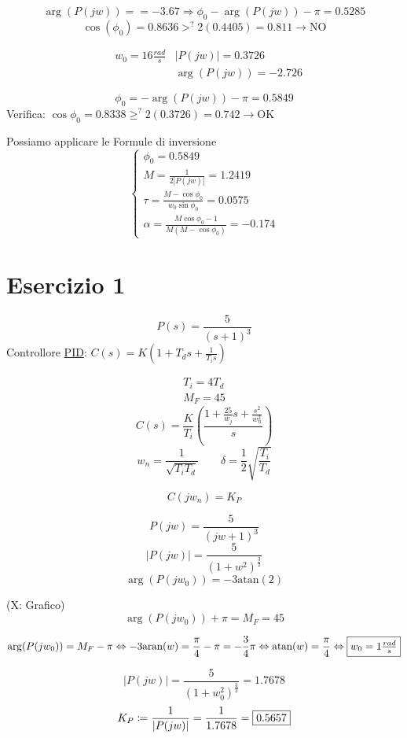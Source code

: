 \documentclass{article}
\begin{document}
\[ \arg(P(jw)) =  = -3.67 \Rightarrow \phi_0 - \arg(P(jw)) - \pi = 0.5285 \]
\[ \cos (\phi_0) = 0.8636 >^? 2(0.4405) = 0.811 \rightarrow \text{NO}\]


\[
\begin{aligned}
    &w_0 = 16 \frac{rad}{s} & |P(jw)| = 0.3726\\
& & \arg(P(jw)) = -2.726
\end{aligned}
\]

\[ \phi_0 = -\arg(P(jw)) - \pi = 0.5849 \]
Verifica: $\cos \phi_0 = 0.8338 \ge^? 2(0.3726) = 0.742 \rightarrow \text{OK}$

Possiamo applicare le Formule di inversione
\[
\begin{cases}
    \phi_0 = 0.5849\\
    M = \frac{1}{2|P(jw)|} = 1.2419\\
    \tau = \frac{M - \cos\phi_0}{w_0 \sin \phi_0} = 0.0575\\
    \alpha = \frac{M\cos\phi_0 -1} {M(M - \cos \phi_0)} = - 0.174
\end{cases}
\]

\section{Esercizio 1}

\[ P(s) = \frac{5}{(s+1)^3} \]
Controllore \underline{PID}: $ C(s) = K\left(1 + T_d s + \frac{1}{T_i s}\right)$

\[
\begin{split}
    T_i = 4T_d\\
    M_F = 45
\end{split}
\]
\[ C(s) = \frac{K}{T_i}\left( \frac{1 + \frac{25}{w_j}s + \frac{s^2}{w_n^2}}{s}\right)\]
\[ w_n = \frac{1}{\sqrt{T_iT_d}} \qquad \delta = \frac{1}{2}\sqrt{\frac{T_i}{T_d}} \]

\[ C(jw_n) = K_P \]

\[ P(jw) = \frac{5}{(jw+1)^3} \]
\[ |P(jw)| = \frac{5}{(1 + w^2) ^{\frac{3}{2}}} \]
\[ \arg(P(jw_0)) = -3 \text{atan}(2) \]

%
(X: Grafico)
\[ \arg(P(jw_0)) + \pi = M_F = 45 \]

\[ \arg(P(jw_0)) = M_F - \pi \Leftrightarrow -3 \text{aran}(w) = \frac{\pi}{4} - \pi = -\frac{3}{4}\pi \Leftrightarrow \text{atan}(w) = \frac{\pi}{4} \Leftrightarrow \framebox{$w_0 = 1 \frac{rad}{s}$}\]

\[ |P(jw)| = \frac{5}{(1 + w_0^2)^{\frac{3}{2}}} = 1.7678 \]
\[ K_P \coloneqq \frac{1}{|P(jw)|} = \frac{1}{1.7678} = \framebox{$0.5657$} \]
\end{document}
